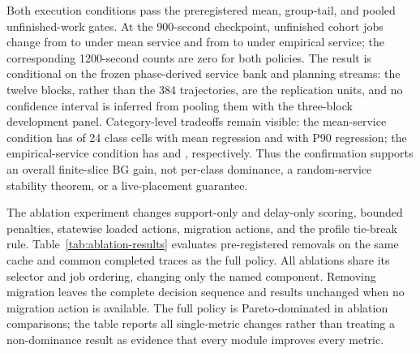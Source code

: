 \documentclass[opre,dblanonrev]{informs4}
\begin{document}
Both execution conditions pass the preregistered mean, group-tail, and pooled
unfinished-work gates.  At the 900-second checkpoint, unfinished cohort jobs
change from \BGConfirmationMeanUnfinishedNineHundredMW{} to
\BGConfirmationMeanUnfinishedNineHundredBG{} under mean service and from
\BGConfirmationEmpiricalUnfinishedNineHundredMW{} to
\BGConfirmationEmpiricalUnfinishedNineHundredBG{} under empirical service;
the corresponding 1200-second counts are zero for both policies.  The result
is conditional on the frozen phase-derived service bank and planning streams:
the twelve blocks, rather than the 384 trajectories, are the replication
units, and no confidence interval is inferred from pooling them with the
three-block development panel.  Category-level tradeoffs remain visible: the
mean-service condition has \BGConfirmationMeanCategoryMeanRegressions{} of 24
class cells with mean regression and \BGConfirmationMeanCategoryPNinetyRegressions{}
with P90 regression; the empirical-service condition has
\BGConfirmationEmpiricalCategoryMeanRegressions{} and
\BGConfirmationEmpiricalCategoryPNinetyRegressions{}, respectively.  Thus the
confirmation supports an overall finite-slice BG gain, not per-class
dominance, a random-service stability theorem, or a live-placement guarantee.

The ablation experiment changes support-only and delay-only scoring, bounded
penalties, statewise loaded actions, migration actions, and the profile
tie-break rule.  Table~\ref{tab:ablation-results} evaluates
\UnifiedAblationPolicyCount{} pre-registered removals on the same cache and
common completed traces as the full policy.  All ablations share its selector
and job ordering, changing only the named component.  Removing migration leaves
the complete decision sequence and results unchanged when no migration action
is available.  The full policy is Pareto-dominated in
\UnifiedAblationDominatesFullCount{} ablation comparisons; the table reports all
single-metric changes rather than treating a non-dominance result as evidence
that every module improves every metric.

\begin{table}[t]
\end{table}
\end{document}
